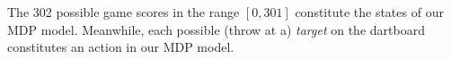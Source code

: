 \documentclass[solution, letterpaper]{cs121}
\begin{document}

\subproblem{} %
The 302 possible game scores in the range $[0,301]$ constitute the states of our MDP model. Meanwhile, each possible (throw at a) \emph{target} on the dartboard constitutes an action in our MDP model.

\subproblem{} %


\subproblem{} %


\subproblem{} %


\subproblem{} %


\subproblem{} %






\end{document}
